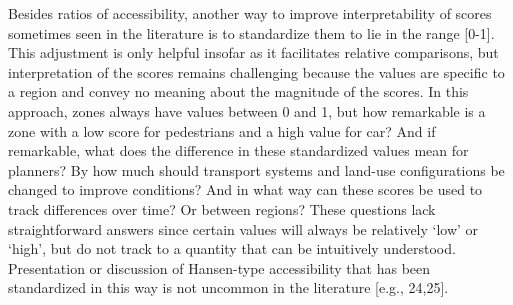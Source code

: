 \documentclass[10pt,letterpaper]{article}
\begin{document}
Besides ratios of accessibility, another way to improve interpretability
of scores sometimes seen in the literature is to standardize them to lie
in the range {[}0-1{]}. This adjustment is only helpful insofar as it
facilitates relative comparisons, but interpretation of the scores
remains challenging because the values are specific to a region and
convey no meaning about the magnitude of the scores. In this approach,
zones always have values between 0 and 1, but how remarkable is a zone
with a low score for pedestrians and a high value for car? And if
remarkable, what does the difference in these standardized values mean
for planners? By how much should transport systems and land-use
configurations be changed to improve conditions? And in what way can
these scores be used to track differences over time? Or between regions?
These questions lack straightforward answers since certain values will
always be relatively `low' or `high', but do not track to a quantity
that can be intuitively understood. Presentation or discussion of
Hansen-type accessibility that has been standardized in this way is not
uncommon in the literature {[}e.g., 24,25{]}.
\end{document}
